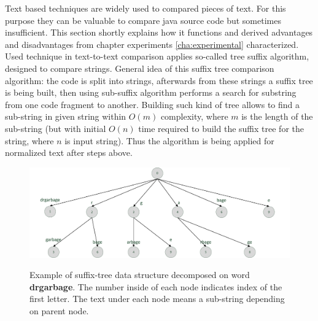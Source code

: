 \documentclass{report}
\begin{document}
Text based techniques are widely used to compared pieces of text. For this purpose they can be valuable to compare java source code but sometimes insufficient. This section shortly explains how it functions and derived advantages and disadvantages from chapter experiments \ref{cha:experimental} characterized. Used technique in text-to-text comparison applies so-called tree suffix algorithm, designed to compare strings. General idea of this suffix tree comparison algorithm: the code is split into strings, afterwards from these strings a suffix tree is being built, then using sub-suffix algorithm performs a search for substring from one code fragment to another. Building such kind of tree allows to find a sub-string in given string within $O(m)$ complexity, where $m$ is the length of the sub-string (but with initial $O(n)$ time required to build the suffix tree for the string, where $n$ is input string). Thus the algorithm is being applied for normalized text after steps above. 
\vspace{5mm}
\begin{figure}[h]
  \centering
  \includegraphics[scale=0.65]{Figures/exist-alg/suffix-tree.pdf}\\[0.1cm]
  \caption[Example of suffix-tree data structure decomposed on word ]{Example of suffix-tree data structure decomposed on word \textbf{drgarbage}. The number inside of each node indicates index of the first letter. The text under each node means a sub-string depending on parent node.}
  \label{fig:suffixtreeexample}
\end{figure}
\end{document}

